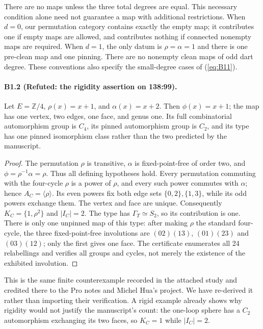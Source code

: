There are no maps unless the three total degrees are equal. This necessary
condition alone need not guarantee a map with additional restrictions.
When $d=0$, our permutation category contains exactly the empty map;
it contributes one if empty maps are allowed, and contributes nothing
if connected nonempty maps are required. When $d=1$, the only datum is
$\rho=\alpha=1$ and there is one pre-clean map and one pinning.
There are no nonempty clean maps of odd dart degree. These conventions
also specify the small-degree cases of (\ref{eq:B11}).

\paragraph{B1.2 (Refuted: the rigidity assertion on 138:99).}
Let $E=\mathbb Z/4$, $\rho(x)=x+1$, and $\alpha(x)=x+2$.
Then $\phi(x)=x+1$; the map has one vertex, two edges, one face,
and genus one. Its full combinatorial automorphism group is $C_4$,
its pinned automorphism group is $C_2$, and its type has one pinned
isomorphism class rather than the two predicted by the manuscript.

\begin{proof}
The permutation $\rho$ is transitive, $\alpha$ is fixed-point-free of
order two, and $\phi=\rho^{-1}\alpha=\rho$. Thus all defining hypotheses
hold. Every permutation commuting with the four-cycle $\rho$ is a
power of $\rho$, and every such power commutes with $\alpha$; hence
$A_C=\langle\rho\rangle$. Its even powers fix both edge sets
$\{0,2\},\{1,3\}$, while its odd powers exchange them. The vertex and
face are unique. Consequently $K_C=\{1,\rho^2\}$ and $|I_C|=2$.
The type has $\Gamma_T\simeq S_2$, so its contribution is one.
There is only one unpinned map of this type: after making $\rho$ the
standard four-cycle, the three fixed-point-free involutions are
$(02)(13)$, $(01)(23)$ and $(03)(12)$; only the first gives one face.
The certificate enumerates all 24 relabellings and verifies all groups
and cycles, not merely the existence of the exhibited involution.
\end{proof}

This is the same finite counterexample recorded in the attached study
and credited there to the Pro notes and Michel Hua's project. We have
re-derived it rather than importing their verification. A rigid example
already shows why rigidity would not justify the manuscript's count:
the one-loop sphere has a $C_2$ automorphism exchanging its two faces,
so $K_C=1$ while $|I_C|=2$.

